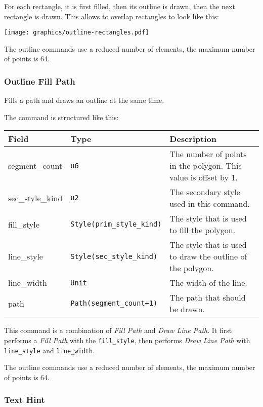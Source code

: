 \documentclass[]{article}
\begin{document}
For each rectangle, it is first filled, then its outline is drawn, then
the next rectangle is drawn. This allows to overlap rectangles to look
like this:

\begin{center}
\texttt{[image: graphics/outline-rectangles.pdf]}
\end{center}

The outline commands use a reduced number of elements, the maximum
number of points is 64.

\hypertarget{outline-fill-path}{\subsubsection{Outline Fill Path}\label{outline-fill-path}}

Fills a path and draws an outline at the same time.

The command is structured like this:

\begin{longtable}[]{@{}p{1in}p{1.6in}p{3.4in}@{}}
\toprule
Field & Type & Description \\
\midrule
\endhead
segment\_count   & \texttt{u6}                       & The number of points in the polygon. This value is offset by 1. \\
sec\_style\_kind & \texttt{u2}                       & The secondary style used in this command. \\
fill\_style      & \texttt{Style(prim\_style\_kind)} & The style that is used to fill the polygon. \\
line\_style      & \texttt{Style(sec\_style\_kind)}  & The style that is used to draw the outline of the polygon. \\
line\_width      & \texttt{Unit}                     & The width of the line. \\
path             & \texttt{Path(segment\_count+1)}   & The path that should be drawn. \\
\bottomrule
\end{longtable}

This command is a combination of \emph{Fill Path} and \emph{Draw Line Path}.
It first performs a \emph{Fill Path} with the \texttt{fill\_style}, then
performs \emph{Draw Line Path} with \texttt{line\_style} and
\texttt{line\_width}.

The outline commands use a reduced number of elements, the maximum
number of points is 64.

\hypertarget{text-hint}{\subsubsection{Text Hint}\label{text-hint}}
\end{document}
